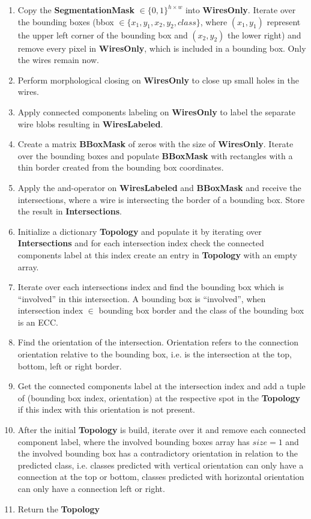 \begin{enumerate}
    \item Copy the \textbf{SegmentationMask} $\in \{0,1\}^{h \times w}$  into \textbf{WiresOnly}. Iterate over the bounding boxes (bbox $\in \{x_1, y_1, x_2, y_2, class\}$, where $(x_1, y_1)$ represent the upper left corner of the bounding box and $(x_2, y_2)$ the lower right) and remove every pixel in \textbf{WiresOnly}, which is included in a bounding box. Only the wires remain now.
    \item Perform morphological closing on \textbf{WiresOnly} to close up small holes in the wires.
    \item Apply connected components labeling on \textbf{WiresOnly} to label the separate wire blobs resulting in \textbf{WiresLabeled}.
    \item Create a matrix \textbf{BBoxMask} of zeros with the size of \textbf{WiresOnly}. Iterate over the bounding boxes and populate \textbf{BBoxMask} with rectangles with a thin border created from the bounding box coordinates.
    \item Apply the and-operator on \textbf{WiresLabeled} and \textbf{BBoxMask} and receive the intersections, where a wire is intersecting the border of a bounding box. Store the result in \textbf{Intersections}.
    \item Initialize a dictionary \textbf{Topology} and populate it by iterating over \textbf{Intersections} and for each intersection index check the connected components label at this index create an entry in \textbf{Topology} with an empty array.
    \item Iterate over each intersections index and find the bounding box which is ``involved'' in this intersection. A bounding box is ``involved'', when intersection index $\in$ bounding box border and the class of the bounding box is an \ac{ECC}.
    \item Find the orientation of the intersection. Orientation refers to the connection orientation relative to the bounding box, i.e. is the intersection at the top, bottom, left or right border.
    \item Get the connected components label at the intersection index and add a tuple of (bounding box index, orientation) at the respective spot in the \textbf{Topology} if this index with this orientation is not present.
    \item After the initial \textbf{Topology} is build, iterate over it and remove each connected component label, where the involved bounding boxes array has $size = 1$ and the involved bounding box has a contradictory orientation in relation to the predicted class, i.e. classes predicted with vertical orientation can only have a connection at the top or bottom, classes predicted with horizontal orientation can only have a connection left or right.
    \item Return the \textbf{Topology}
\end{enumerate}

